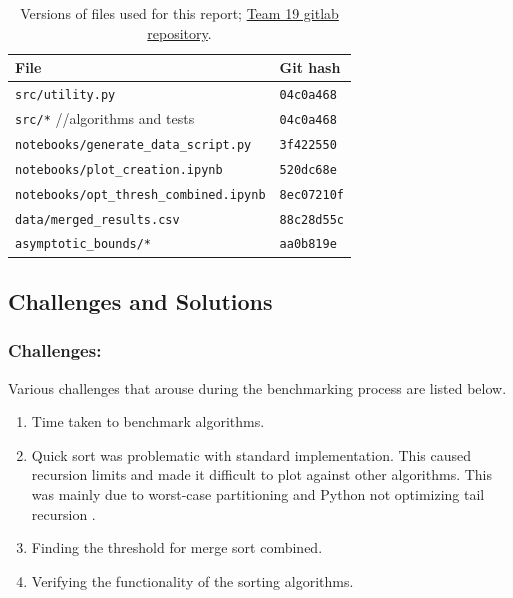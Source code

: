 \documentclass[sigconf, nonacm, natbib, screen, balance=False]{acmart}
\begin{document}
\begin{table}
  \caption{Versions of files used for this report; {\href{https://gitlab.com/nmbu.no/emner/inf221/h2020/student-term-papers/team_19/inf221-term-paper-team19}{Team 19 gitlab repository}}.}
  \label{tab:hashes}
  \begin{tabular}{ll}
    \hline
    File & Git hash \\\hline
    \verb!src/utility.py! & \verb!04c0a468! \\
    \verb!src/*!        //algorithms and tests & \verb!04c0a468! \\
    \verb!notebooks/generate_data_script.py! & \verb!3f422550! \\
    \verb!notebooks/plot_creation.ipynb! & \verb!520dc68e! \\
    \verb!notebooks/opt_thresh_combined.ipynb! & \verb!8ec07210f! \\
    \verb!data/merged_results.csv! & \verb!88c28d55c! \\
    \verb!asymptotic_bounds/*! & \verb!aa0b819e! \\\hline
  \end{tabular}
\end{table}

\subsection{Challenges and Solutions}\label{sec:challenges&solutions}

\subsubsection{Challenges:}\label{sec:challenges} Various challenges that arouse during the benchmarking process are listed below.

\begin{enumerate}
\item Time taken to benchmark algorithms.
\item Quick sort was problematic with standard implementation. This caused recursion limits and made it difficult to plot against other algorithms. This was mainly due to worst-case partitioning and Python not optimizing tail recursion \cite{Neopytho23:online}. 
\item Finding the threshold for merge sort combined.
\item Verifying the functionality of the sorting algorithms.

\end{enumerate}
\end{document}
